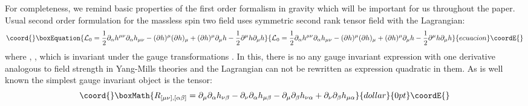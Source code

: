 \documentclass[a4paper,12pt]{article}
\begin{document}
For completeness, we remind basic properties of the first order
formalism in gravity which will be important for us throughout the
paper. Usual second order formulation for the massless spin two field
uses symmetric second rank tensor field \coordHE{} with the
Lagrangian:
\begin{equation}\coord{}\boxEquation{
{\cal L}_0 = \frac{1}{2} \partial_\alpha h^{\mu\nu} \partial_\alpha
h_{\mu\nu} - (\partial h)^\mu (\partial h)_\mu + (\partial h)^\mu
\partial_\mu h - \frac{1}{2} \partial^\mu h \partial_\mu h
}{
{\cal L}_0 = \frac{1}{2} \partial_\alpha h^{\mu\nu} \partial_\alpha
h_{\mu\nu} - (\partial h)^\mu (\partial h)_\mu + (\partial h)^\mu
\partial_\mu h - \frac{1}{2} \partial^\mu h \partial_\mu h
}{ecuacion}\coordE{}\end{equation}
where \coordHE{}, \coordHE{},
which is invariant under the gauge transformations
\coordHE{}.
In this, there is no any gauge invariant expression with one
derivative analogous to field strength in Yang-Mills theories and the
Lagrangian can not be rewritten as expression quadratic in them.
As is well known the simplest gauge invariant object is the tensor:
$$\coord{}\boxMath{
R_{[\mu\nu],[\alpha\beta]} = \partial_\mu \partial_\alpha h_{\nu\beta}
- \partial_\nu \partial_\alpha h_{\mu\beta} - \partial_\mu
\partial_\beta h_{\nu\alpha} + \partial_\nu \partial_\beta
h_{\mu\alpha}
}{dollar}{0pt}\coordE{}$$
\end{document}
